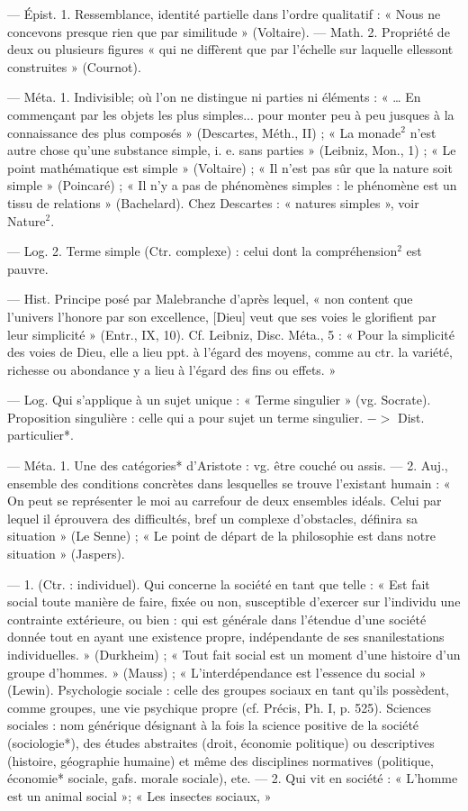\begin{itemize}[leftmargin=1cm, label=, itemsep=1pt]
 — Épist. 1. Ressemblance,
identité partielle dans l’ordre qualitatif : « Nous ne concevons presque
rien que par similitude » (Voltaire).
— Math. 2. Propriété de deux ou
plusieurs figures « qui ne diffèrent
que par l'échelle sur laquelle ellessont construites » (Cournot).

 — Méta. 1. Indivisible; où l’on
ne distingue ni parties ni éléments :
« … En commençant par les objets
les plus simples... pour monter peu
à peu jusques à la connaissance
des plus composés » (Descartes,
Méth., II) ; « La monade$^2$ n’est autre
chose qu’une substance simple, i. e.
sans parties » (Leibniz, Mon., 1) ;
« Le point mathématique est simple »
(Voltaire) ; « Il n’est pas sûr que la
nature soit simple » (Poincaré) ; « Il
n'y a pas de phénomènes simples :
le phénomène est un tissu de relations » (Bachelard). Chez Descartes :
« natures simples », voir Nature$^2$.

— Log. 2. Terme simple (Ctr.
complexe) : celui dont la compréhension$^2$ est pauvre.

 — Hist. Principe
posé par Malebranche d’après lequel,
« non content que l'univers l’honore
par son excellence, [Dieu] veut que
ses voies le glorifient par leur simplicité » (Entr., IX, 10). Cf. Leibniz,
Disc. Méta., 5 : « Pour la simplicité
des voies de Dieu, elle a lieu ppt. à
l'égard des moyens, comme au ctr.
la variété, richesse ou abondance
y a lieu à l'égard des fins ou effets. »

 — Log. Qui s'applique à un
sujet unique : « Terme singulier »
(vg. Socrate). Proposition singulière :
celle qui a pour sujet un terme singulier. $->$ Dist. particulier*.

 — Méta. 1. Une des catégories* d'Aristote : vg. être couché
ou assis. — 2. Auj., ensemble des
conditions concrètes dans lesquelles
se trouve l'existant humain : « On
peut se représenter le moi au carrefour de deux ensembles idéals.
Celui par lequel il éprouvera des
difficultés, bref un complexe d’obstacles, définira sa situation » (Le
Senne) ; « Le point de départ de la
philosophie est dans notre situation »
(Jaspers).

 — 1. (Ctr. : individuel). Qui
concerne la société en tant que telle :
« Est fait social toute manière de
faire, fixée ou non, susceptible
d'exercer sur l'individu une contrainte extérieure, ou bien : qui est
générale dans l'étendue d’une société donnée tout en ayant une existence propre, indépendante de ses
snanilestations individuelles. » (Durkheim) ; « Tout fait social est un
moment d’une histoire d’un groupe
d'hommes. » (Mauss) ; « L’interdépendance est l'essence du social »
(Lewin). Psychologie sociale : celle
des groupes sociaux en tant qu'ils
possèdent, comme groupes, une vie
psychique propre (cf. Précis, Ph. I,
p. 525). Sciences sociales : nom
générique désignant à la fois la
science positive de la société (sociologie*), des études abstraites (droit,
économie politique) ou descriptives
(histoire, géographie humaine) et
même des disciplines normatives
(politique, économie* sociale, gafs.
morale sociale), ete. — 2. Qui vit
en société : « L'homme est un
animal social »; « Les insectes sociaux, »


\end{itemize}

